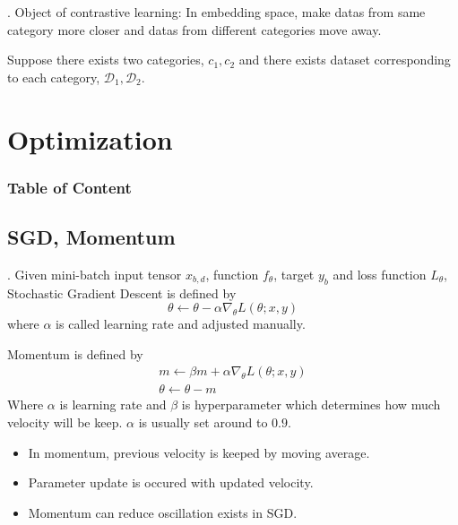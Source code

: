 \documentclass[8pt]{beamer}
\newcommand{\mc}[1]{\mathcal{#1}}
\begin{document}
\begin{frame}{.}
    Object of contrastive learning: In embedding space, make datas from same category more closer and datas from different categories move away.

    \bigskip
    Suppose there exists two categories, $c_1, c_2$ and there exists dataset corresponding to each category, $\mc{D}_1, \mc{D}_2$.
\end{frame}



\section{Optimization}
\begingroup
    \begin{frame}
        \frametitle{Table of Content}
        \tableofcontents
    \end{frame}
\endgroup
\subsection{SGD, Momentum}

\begin{frame}{.}
    Given mini-batch input tensor $x_{b,d}$, function $f_\theta$, target $y_b$ and loss function $L_\theta$, Stochastic Gradient Descent is defined by
    \[
        \theta \leftarrow \theta - \alpha \nabla_\theta L (\theta; x, y)
    \]
    where $\alpha$ is called learning rate and adjusted manually.

    \bigskip
    Momentum is defined by
    \[
    \begin{gathered}
        m \leftarrow \beta m + \alpha \nabla_\theta L(\theta;x,y) \\
        \theta \leftarrow \theta  - m
    \end{gathered}
    \]
    Where $\alpha$ is learning rate and $\beta$ is hyperparameter which determines how much velocity will be keep. $\alpha$ is usually set around to $0.9$.
    \begin{itemize}
        \item In momentum, previous velocity is keeped by moving average.
        \item Parameter update is occured with updated velocity.
        \item Momentum can reduce oscillation exists in SGD.
    \end{itemize}
\end{frame}
\end{document}
